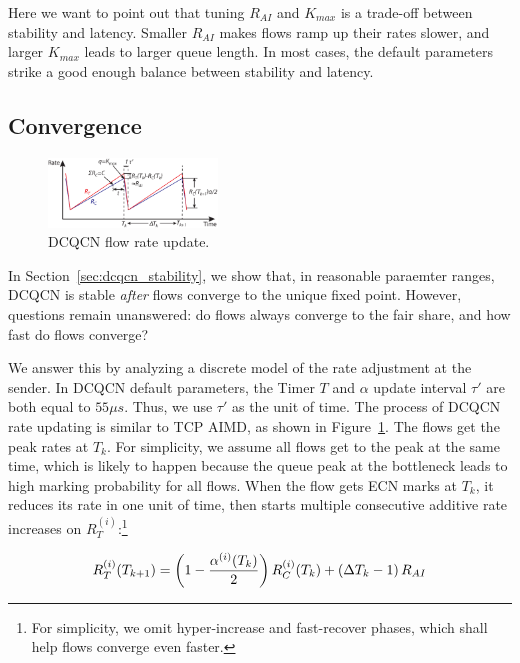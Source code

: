 Here we want to point out that tuning $R_{AI}$ and $K_{max}$ is a trade-off
between stability and latency. Smaller $R_{AI}$ makes flows ramp up their rates
slower, and larger $K_{max}$ leads to larger queue length. In most cases, the
default parameters strike a good enough balance between stability and latency.

\subsection{Convergence}

\begin{figure}[t]
\center
\includegraphics[width=0.4\textwidth]{figures/dcqcn_convergence.eps}
\caption{DCQCN flow rate update.}
\label{fig:dcqcn_convergence}
\end{figure}

In Section~\ref{sec:dcqcn_stability}, we show that, in reasonable paraemter ranges, 
DCQCN is stable {\em after} flows converge to the unique fixed point. However,
questions remain unanswered: do flows always converge to the fair share, and how fast
do flows converge? 

We answer this by analyzing a discrete model of the rate adjustment at the sender. In
DCQCN default parameters, the Timer $T$ and $\alpha$ update interval $\tau '$ are both 
equal to $55\mu s$. Thus, we use $\tau '$ as the unit of time. The process of DCQCN
rate updating is similar to TCP AIMD, as shown in Figure~\ref{fig:dcqcn_convergence}.
The flows get the peak rates at $T_k$. For simplicity, we assume all flows get to the peak
at the same time, which is likely to happen because the queue peak at the bottleneck 
leads to high marking probability for all flows. When the flow gets ECN marks at $T_k$,
it reduces its rate in one unit of time, then starts multiple consecutive additive rate 
increases on $R_T^{(i)}$:\footnote{For simplicity, we omit hyper-increase and fast-recover phases, 
which shall help flows converge even faster.}

\begin{equation}
\small
R_T^{(i)}({T_{k + 1}}) = \left( {1 - \frac{{{\alpha ^{(i)}}({T_k})}}{2}} \right)R_C^{(i)}({T_k}) + \left( {\Delta {T_k} - 1} \right){R_{AI}}
\label{eq:converge_rc}
\end{equation}

